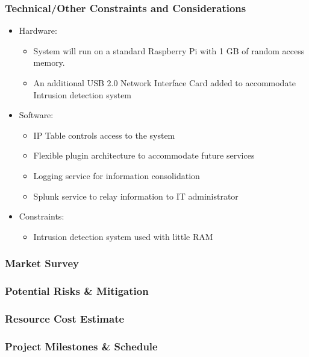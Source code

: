 \begin{frame}
\frametitle{Technical/Other Constraints and Considerations}

\begin{itemize}
\item Hardware:
\begin{itemize}
\item System will run on a standard Raspberry Pi with 1 GB of random access memory.  
\item An additional USB 2.0 Network Interface Card added to accommodate Intrusion detection system
\end{itemize}

\item Software:
\begin{itemize}
\item IP Table controls access to the system
\item Flexible plugin architecture to accommodate future services
\item Logging service for information consolidation
\item Splunk service to relay information to IT administrator
\end{itemize}

\item Constraints:
\begin{itemize}
\item Intrusion detection system used with little RAM
\end{itemize}


\end{itemize}

\end{frame}

\begin{frame}
\frametitle{Market Survey}


\end{frame}

\begin{frame}
\frametitle{Potential Risks \& Mitigation}


\end{frame}

\begin{frame}
\frametitle{Resource Cost Estimate}


\end{frame}

\begin{frame}
\frametitle{Project Milestones \& Schedule}


\end{frame}
